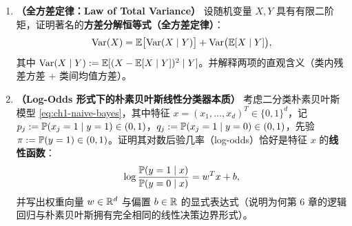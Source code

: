 \begin{enumerate}[label=\textbf{1.\arabic*}, leftmargin=2.4em, resume]
  \item \textbf{（全方差定律：Law of Total Variance）} 设随机变量 $X, Y$ 具有有限二阶矩，证明著名的\textbf{方差分解恒等式（全方差定律）}：
  \[
    \operatorname{Var}(X) = \mathbb{E}\bigl[\operatorname{Var}(X \mid Y)\bigr] + \operatorname{Var}\bigl(\mathbb{E}[X \mid Y]\bigr),
  \]
  其中 $\operatorname{Var}(X \mid Y) := \mathbb{E}[(X - \mathbb{E}[X \mid Y])^2 \mid Y]$。并解释两项的直观含义（类内残差方差 + 类间均值方差）。

  \item \textbf{（Log-Odds 形式下的朴素贝叶斯线性分类器本质）} 考虑二分类朴素贝叶斯模型 \eqref{eq:ch1-naive-bayes}，其中特征 $x = (x_1, \dots, x_d)^T \in \{0, 1\}^d$，记 $p_j := \mathbb{P}(x_j=1 \mid y=1) \in (0,1)$，$q_j := \mathbb{P}(x_j=1 \mid y=0) \in (0,1)$，先验 $\pi := \mathbb{P}(y=1) \in (0,1)$。证明其对数后验几率（log-odds）恰好是特征 $x$ 的\textbf{线性函数}：
  \[
    \log \frac{\mathbb{P}(y=1 \mid x)}{\mathbb{P}(y=0 \mid x)} = w^T x + b,
  \]
  并写出权重向量 $w \in \mathbb{R}^d$ 与偏置 $b \in \mathbb{R}$ 的显式表达式（说明为何第 6 章的逻辑回归与朴素贝叶斯拥有完全相同的线性决策边界形式）。
\end{enumerate}


